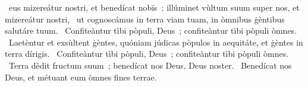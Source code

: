 \psalmChapterWithInscription{}
{ }
{%
~eus mizereátur nostri, et benedícat nobïs~; illúminet vùltum suum super nos, et mizereátur nostri, 
~ut cognoscámus in terra viam tuam, in òmnibus ġèntibus salutáre tuum. 
~Confiteàntur tìbi pòpuli, Deus~; confiteàntur tìbi pòpuli òmnes. 
~Laetèntur et exsùltent ġèntes, quóniam júdicas pòpulos in aequitáte, et ġèntes in terra dírigis. 
~Confiteàntur tìbi pòpuli, Deus~; confiteàntur tìbi pòpuli òmnes. 
~Terra dèdit fructum suum~; benedícat nos Deus, Deus noster. 
~Benedícat nos Deus, et métuant eum òmnes fines terrae. 
}
